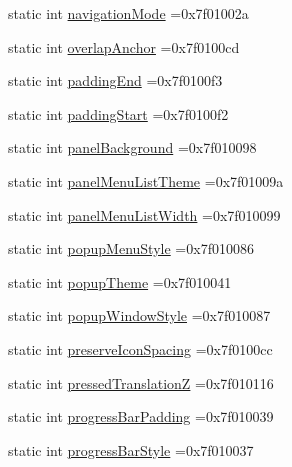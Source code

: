 \begin{DoxyCompactItemize}
\item 
static int \hyperlink{classandroid_1_1support_1_1v7_1_1mediarouter_1_1R_1_1attr_a44f0e044154a4084dcd2d30245a4e7be}{navigation\+Mode} =0x7f01002a
\item 
static int \hyperlink{classandroid_1_1support_1_1v7_1_1mediarouter_1_1R_1_1attr_ac3121877d0453524ba0e96b87e36ad98}{overlap\+Anchor} =0x7f0100cd
\item 
static int \hyperlink{classandroid_1_1support_1_1v7_1_1mediarouter_1_1R_1_1attr_ab54f21235724f13f9760dad1e6989074}{padding\+End} =0x7f0100f3
\item 
static int \hyperlink{classandroid_1_1support_1_1v7_1_1mediarouter_1_1R_1_1attr_a2f3d96d256743ab34d00d4423d23ea0f}{padding\+Start} =0x7f0100f2
\item 
static int \hyperlink{classandroid_1_1support_1_1v7_1_1mediarouter_1_1R_1_1attr_a1d98e884dfa8884e0fb449668c534c55}{panel\+Background} =0x7f010098
\item 
static int \hyperlink{classandroid_1_1support_1_1v7_1_1mediarouter_1_1R_1_1attr_ab31a72aff48e97ff68184ca0bed5c54d}{panel\+Menu\+List\+Theme} =0x7f01009a
\item 
static int \hyperlink{classandroid_1_1support_1_1v7_1_1mediarouter_1_1R_1_1attr_a687e9ffbf613fdf2d33d6a6e2ad23d0e}{panel\+Menu\+List\+Width} =0x7f010099
\item 
static int \hyperlink{classandroid_1_1support_1_1v7_1_1mediarouter_1_1R_1_1attr_a12b442d2a68fa9805515836034d2148e}{popup\+Menu\+Style} =0x7f010086
\item 
static int \hyperlink{classandroid_1_1support_1_1v7_1_1mediarouter_1_1R_1_1attr_af485292b7952a70814e465517913886a}{popup\+Theme} =0x7f010041
\item 
static int \hyperlink{classandroid_1_1support_1_1v7_1_1mediarouter_1_1R_1_1attr_a81365945964f66c87ae40a9a13b9c3c4}{popup\+Window\+Style} =0x7f010087
\item 
static int \hyperlink{classandroid_1_1support_1_1v7_1_1mediarouter_1_1R_1_1attr_aa19f437997c712d66bbb1c7d5c68bd0b}{preserve\+Icon\+Spacing} =0x7f0100cc
\item 
static int \hyperlink{classandroid_1_1support_1_1v7_1_1mediarouter_1_1R_1_1attr_a71e55611e4cc49c76b82bdde3905b633}{pressed\+TranslationZ} =0x7f010116
\item 
static int \hyperlink{classandroid_1_1support_1_1v7_1_1mediarouter_1_1R_1_1attr_a4501e46b158aa49c8d42d3183d3fec44}{progress\+Bar\+Padding} =0x7f010039
\item 
static int \hyperlink{classandroid_1_1support_1_1v7_1_1mediarouter_1_1R_1_1attr_a906d7d46aeb18deb13d9cc9c44a9246a}{progress\+Bar\+Style} =0x7f010037

\end{DoxyCompactItemize}
